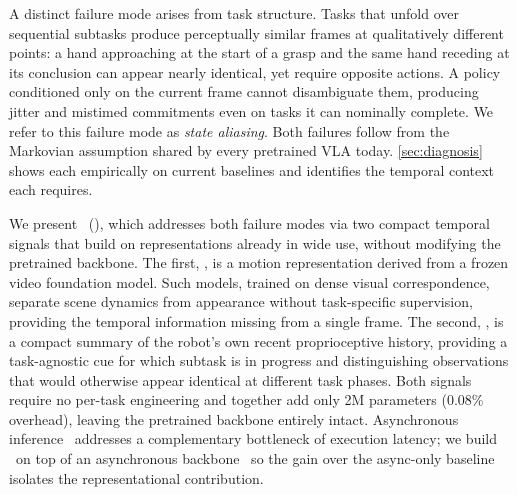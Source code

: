 A distinct failure mode arises from task structure. Tasks that unfold over sequential subtasks produce perceptually similar frames at qualitatively different points: a hand approaching at the start of a grasp and the same hand receding at its conclusion can appear nearly identical, yet require opposite actions. A policy conditioned only on the current frame cannot disambiguate them, producing jitter and mistimed commitments even on tasks it can nominally complete. We refer to this failure mode as \emph{state aliasing}. Both failures follow from the Markovian assumption shared by every pretrained VLA today. \cref{sec:diagnosis} shows each empirically on current baselines and identifies the temporal context each requires.

We present \ours~(), which addresses both failure modes via two compact temporal signals that build on representations already in wide use, without modifying the pretrained backbone. The first, \TEMPOMOT, is a motion representation derived from a frozen video foundation model. Such models, trained on dense visual correspondence, separate scene dynamics from appearance without task-specific supervision, providing the temporal information missing from a single frame. The second, \TEMPOACT, is a compact summary of the robot's own recent proprioceptive history, providing a task-agnostic cue for which subtask is in progress and distinguishing observations that would otherwise appear identical at different task phases. Both signals require no per-task engineering and together add only 2M parameters (0.08\% overhead), leaving the pretrained backbone entirely intact. Asynchronous inference~\cite{rtc, vlash} addresses a complementary bottleneck of execution latency; we build \ours\ on top of an asynchronous backbone~\cite{vlash} so the gain over the async-only baseline isolates the representational contribution.

